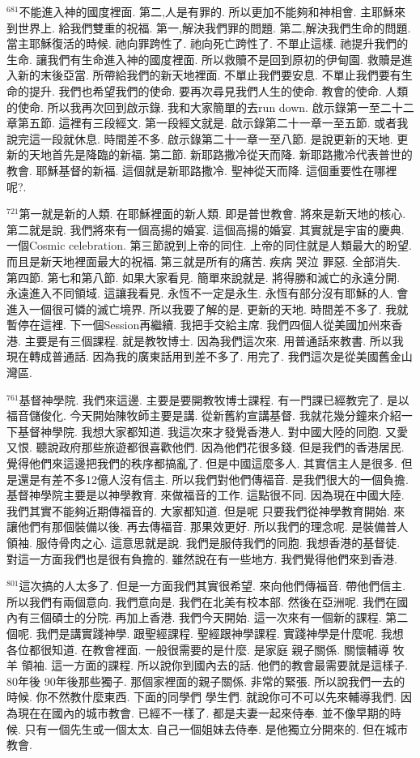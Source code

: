 \documentclass{book}
\begin{document}
$^{681}$不能進入神的國度裡面.
第二,人是有罪的.
所以更加不能夠和神相會.
主耶穌來到世界上.
給我們雙重的祝福.
第一,解決我們罪的問題.
第二,解決我們生命的問題.
當主耶穌復活的時候.
祂向罪跨性了.
祂向死亡跨性了.
不單止這樣.
祂提升我們的生命.
讓我們有生命進入神的國度裡面.
所以救贖不是回到原初的伊甸園.
救贖是進入新的末後亞當.
所帶給我們的新天地裡面.
不單止我們要安息.
不單止我們要有生命的提升.
我們也希望我們的使命.
要再次尋見我們人生的使命.
教會的使命.
人類的使命.
所以我再次回到啟示錄.
我和大家簡單的去run down.
啟示錄第一至二十二章第五節.
這裡有三段經文.
第一段經文就是.
啟示錄第二十一章一至五節.
或者我說完這一段就休息.
時間差不多.
啟示錄第二十一章一至八節.
是說更新的天地.
更新的天地首先是降臨的新福.
第二節.
新耶路撒冷從天而降.
新耶路撒冷代表普世的教會.
耶穌基督的新福.
這個就是新耶路撒冷.
聖神從天而降.
這個重要性在哪裡呢?.

$^{721}$第一就是新的人類.
在耶穌裡面的新人類.
即是普世教會.
將來是新天地的核心.
第二就是說.
我們將來有一個高揚的婚宴.
這個高揚的婚宴.
其實就是宇宙的慶典.
一個Cosmic celebration.
第三節說到上帝的同住.
上帝的同住就是人類最大的盼望.
而且是新天地裡面最大的祝福.
第三就是所有的痛苦.
疾病 哭泣 罪惡.
全部消失.
第四節.
第七和第八節.
如果大家看見.
簡單來說就是.
將得勝和滅亡的永遠分開.
永遠進入不同領域.
這讓我看見.
永恆不一定是永生.
永恆有部分沒有耶穌的人.
會進入一個很可憐的滅亡境界.
所以我要了解的是.
更新的天地.
時間差不多了.
我就暫停在這裡.
下一個Session再繼續.
我把手交給主席.
我們四個人從美國加州來香港.
主要是有三個課程.
就是教牧博士.
因為我們這次來.
用普通話來教書.
所以我現在轉成普通話.
因為我的廣東話用到差不多了.
用完了.
我們這次是從美國舊金山灣區.

$^{761}$基督神學院.
我們來這邊.
主要是要開教牧博士課程.
有一門課已經教完了.
是以福音儲俊化.
今天開始陳牧師主要是講.
從新舊約宣講基督.
我就花幾分鐘來介紹一下基督神學院.
我想大家都知道.
我這次來才發覺香港人.
對中國大陸的同胞.
又愛又恨.
聽說政府那些旅遊都很喜歡他們.
因為他們花很多錢.
但是我們的香港居民.
覺得他們來這邊把我們的秩序都搞亂了.
但是中國這麼多人.
其實信主人是很多.
但是還是有差不多12億人沒有信主.
所以我們對他們傳福音.
是我們很大的一個負擔.
基督神學院主要是以神學教育.
來做福音的工作.
這點很不同.
因為現在中國大陸.
我們其實不能夠近期傳福音的.
大家都知道.
但是呢 只要我們從神學教育開始.
來讓他們有那個裝備以後.
再去傳福音.
那果效更好.
所以我們的理念呢.
是裝備普人領袖.
服侍骨肉之心.
這意思就是說.
我們是服侍我們的同胞.
我想香港的基督徒.
對這一方面我們也是很有負擔的.
雖然說在有一些地方.
我們覺得他們來到香港.

$^{801}$這次搞的人太多了.
但是一方面我們其實很希望.
來向他們傳福音.
帶他們信主.
所以我們有兩個意向.
我們意向是.
我們在北美有校本部.
然後在亞洲呢.
我們在國內有三個碩士的分院.
再加上香港.
我們今天開始.
這一次來有一個新的課程.
第二個呢.
我們是講實踐神學.
跟聖經課程.
聖經跟神學課程.
實踐神學是什麼呢.
我想各位都很知道.
在教會裡面.
一般很需要的是什麼.
是家庭 親子關係.
關懷輔導 牧羊 領袖.
這一方面的課程.
所以說你到國內去的話.
他們的教會最需要就是這樣子.
80年後 90年後那些獨子.
那個家裡面的親子關係.
非常的緊張.
所以說我們一去的時候.
你不然教什麼東西.
下面的同學們 學生們.
就說你可不可以先來輔導我們.
因為現在在國內的城市教會.
已經不一樣了.
都是夫妻一起來侍奉.
並不像早期的時候.
只有一個先生或一個太太.
自己一個姐妹去侍奉.
是他獨立分開來的.
但在城市教會.
\end{document}
